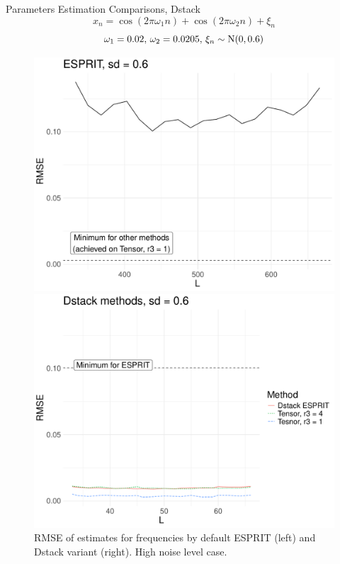 \documentclass[pdf, unicode, ucs, notheorems]{beamer}
\theoremstyle{definition}
\begin{document}
\begin{frame}{Parameters Estimation Comparisons, Dstack}
  \vspace*{-0.3cm}
  \[
    x_{n} = \cos(2 \pi \omega_1 n) +
    \cos(2 \pi \omega_2 n) + \xi_n
  \]
  \[\omega_1 = 0.02,\, \omega_2 = 0.0205,\, \xi_n \sim \mathrm{N}(0, 0.6)\]
  \begin{figure}
    \begin{minipage}{0.48\textwidth}
      \centering
      \includegraphics[width=\textwidth]{img/htlsd_byL_real_param_rmse_esprit_3.pdf}
    \end{minipage}
    \begin{minipage}{0.48\textwidth}
      \centering
      \includegraphics[width=\textwidth]{img/htlsd_byL_real_param_rmse_dstack_3.pdf}
    \end{minipage}
    \caption{RMSE of estimates for frequencies by default ESPRIT
    (left) and Dstack variant (right). High noise level case.}
  \end{figure}
\end{frame}
\end{document}
